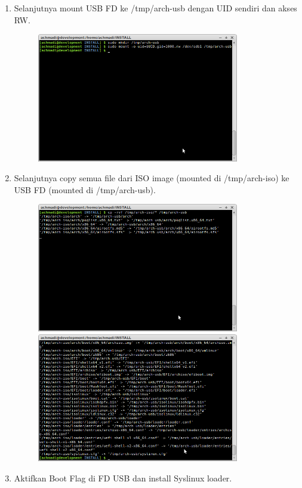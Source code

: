 \documentclass[12pt,]{article}
\begin{document}
\begin{enumerate}
		\item Selanjutnya mount USB FD ke /tmp/arch-usb dengan UID sendiri dan akses RW.
		
		\begin{figure}[!ht]
			\centering
			\includegraphics[width=250pt]{usbubuntu/step_13}
		\end{figure}
	
		\item Selanjutnya copy semua file dari ISO image (mounted di /tmp/arch-iso) ke USB FD (mounted di /tmp/arch-usb).
		
		\begin{figure}[!ht]
			\centering
			\includegraphics[width=250pt]{usbubuntu/step_14}
			\includegraphics[width=250pt]{usbubuntu/step_15}
		\end{figure} 
	
		\item Aktifkan Boot Flag di FD USB dan install Syslinux loader.
		

\end{enumerate}
\end{document}

